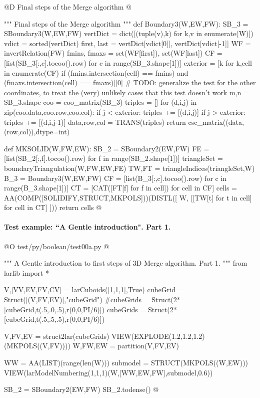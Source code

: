 \documentclass[11pt,oneside]{article}    %
\begin{document}
@D Final steps of the Merge algorithm
@{""" Final steps of the Merge algorithm """  
def Boundary3(W,EW,FW):
	SB_3 = SBoundary3(W,EW,FW)
	vertDict = dict([(tuple(v),k) for k,v in enumerate(W)])
	vdict = sorted(vertDict)
	first, last = vertDict[vdict[0]], vertDict[vdict[-1]]
	WF = invertRelation(FW)
	fmins, fmaxs = set(WF[first]), set(WF[last])
	CF = [list(SB_3[:,c].tocoo().row) for c in range(SB_3.shape[1])]
	exterior = [k for k,cell in enumerate(CF) if (fmins.intersection(cell) == fmins) 
		and (fmaxs.intersection(cell) == fmaxs)][0]
	# TODO: generalize the test for the other coordinates, to treat the (very) unlikely cases that this test doesn't work
	m,n = SB_3.shape
	coo = coo_matrix(SB_3)
	triples = []
	for (d,i,j) in zip(coo.data,coo.row,coo.col):
		if j < exterior:
			triples += [(d,i,j)]
		if j > exterior:
			triples += [(d,i,j-1)]
	data,row,col = TRANS(triples)
	return csc_matrix((data,(row,col)),dtype=int)

def MKSOLID(W,FW,EW):
	SB_2 = SBoundary2(EW,FW)
	FE = [list(SB_2[:,f].tocoo().row) for f in range(SB_2.shape[1])]
	triangleSet = boundaryTriangulation(W,FW,EW,FE)
	TW,FT = triangleIndices(triangleSet,W)
	B_3 = Boundary3(W,EW,FW)
	CF = [list(B_3[:,c].tocoo().row) for c in range(B_3.shape[1])]
	CT = [CAT([FT[f] for f in cell]) for cell in CF] 
	cells = AA(COMP([SOLIDIFY,STRUCT,MKPOLS]))(DISTL([ W, 
		[[TW[t] for t in cell] for cell in CT] ]))
	return cells
@}


\paragraph{Test example: ``A Gentle introduction". Part 1.}
@O test/py/boolean/test00a.py
@{""" A Gentle introduction to first steps of 3D Merge algorithm. Part 1. """
from larlib import *

V,[VV,EV,FV,CV] = larCuboids([1,1,1],True)
cubeGrid = Struct([(V,FV,EV)],"cubeGrid")
#cubeGrids = Struct(2*[cubeGrid,t(.5,.0,.5),r(0,0,PI/6)])
cubeGrids = Struct(2*[cubeGrid,t(.5,.5,.5),r(0,0,PI/6)])

V,FV,EV = struct2lar(cubeGrids)
VIEW(EXPLODE(1.2,1.2,1.2)(MKPOLS((V,FV))))
W,FW,EW = partition(V,FV,EV)

WW = AA(LIST)(range(len(W)))
submodel = STRUCT(MKPOLS((W,EW)))
VIEW(larModelNumbering(1,1,1)(W,[WW,EW,FW],submodel,0.6)) 

SB_2 = SBoundary2(EW,FW)
SB_2.todense()
@}
\end{document}

